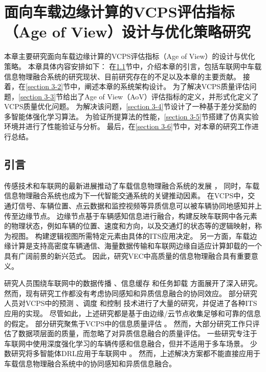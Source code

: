 \chapter{面向车载边缘计算的VCPS评估指标（Age of View）设计与优化策略研究}
本章主要研究面向车载边缘计算的VCPS评估指标（Age of View）的设计与优化策略。
本章具体内容安排如下：
在\ref{section 3-1}节中，介绍本章的引言，包括车联网中车载信息物理融合系统的研究现状、目前研究存在的不足以及本章的主要贡献。
接着，在\ref{section 3-2}节中，阐述本章的系统架构设计。
为了解决VCPS质量评估问题，\ref{section 3-3}节给出了Age of View（AoV）评估指标的定义，并形式化定义了VCPS质量优化问题。
为解决该问题，\ref{section 3-4}节设计了一种基于差分奖励的多智能体强化学习算法。
为验证所提算法的性能，\ref{section 3-5}节搭建了仿真实验环境并进行了性能验证与分析。
最后，在\ref{section 3-6}节中，对本章的研究工作进行总结。

\section{引言}\label{section 3-1}

传感技术和车联网的最新进展推动了车载信息物理融合系统的发展 \cite{jia2015survey}，
同时，车载信息物理融合系统也成为下一代智能交通系统的关键推动因素。
在VCPS中，交通灯信号、车辆位置、点云数据和监控视频等异质信息可以被车辆协同地感知并上传至边缘节点。
边缘节点基于车辆感知信息进行融合，构建反映车联网中各元素的物理状态，例如车辆的位置、速度和方向，以及交通灯的状态等的逻辑映射，称为视图。
构建逻辑视图所需特定元素由具体的ITS应用决定。
另一方面，车载边缘计算\cite{liu2022fedcpf}是支持高密度车辆通信、海量数据传输和车联网边缘自适应计算卸载的一个具有广阔前景的新兴范式。
因此，研究VEC中高质量的信息物理融合具有重要意义。

研究人员围绕车联网中的数据传播 \cite{liu2021fog, singh2020intent}、信息缓存 \cite{zhang2022digital, dai2020deep, su2018an} 和任务卸载 \cite{shang2021deep, liao2021learning} 方面展开了深入研究。
然而，现有研究工作都没有考虑协同感知和异质信息融合的协同效应。
部分研究人员对VCPS中的预测 \cite{zhang2019a, zhang2020data}、调度 \cite{li2020cyber, lian2021cyber} 和控制 \cite{dai2016a, hu2017cyber, lv2018driving} 技术进行了大量的研究，并促进了各种ITS应用的实现。
尽管如此，上述研究都是基于由边缘/云节点收集足够和可靠的信息的假定。
部分研究聚焦于VCPS中的信息质量评估 \cite{liu2014temporal, dai2019temporal, liu2014scheduling, rager2017scalability, yoon2021performance}。
然而，大部分研究工作只评估了数据项层面的质量，而忽略了对异质信息融合的质量评估。
一些研究专注于车联网中使用深度强化学习的车辆传感和信息融合，但并不适用于多车场景。
少数研究将多智能体DRL应用于车联网中 \cite{kumar2022multi, he2021efficient}。
然而，上述解决方案都不能直接应用于车载信息物理融合系统中的协同感知和异质信息融合。

